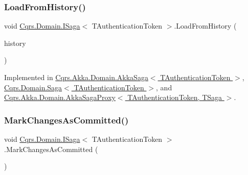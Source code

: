\mbox{\label{interfaceCqrs_1_1Domain_1_1ISaga_a2714804684bc65cf4dec79b4697b9b21_a2714804684bc65cf4dec79b4697b9b21}} 
\subsubsection{\texorpdfstring{Load\+From\+History()}{LoadFromHistory()}}
{\footnotesize\ttfamily void \hyperlink{interfaceCqrs_1_1Domain_1_1ISaga}{Cqrs.\+Domain.\+I\+Saga}$<$ T\+Authentication\+Token $>$.Load\+From\+History (\begin{DoxyParamCaption}\item[{I\+Enumerable$<$ \hyperlink{interfaceCqrs_1_1Events_1_1ISagaEvent}{I\+Saga\+Event}$<$ T\+Authentication\+Token $>$$>$}]{history }\end{DoxyParamCaption})}



Implemented in \hyperlink{classCqrs_1_1Akka_1_1Domain_1_1AkkaSaga_a40b859bc15c2f7c87a21b07f9bc9548c_a40b859bc15c2f7c87a21b07f9bc9548c}{Cqrs.\+Akka.\+Domain.\+Akka\+Saga$<$ T\+Authentication\+Token $>$}, \hyperlink{classCqrs_1_1Domain_1_1Saga_a6029fc09445e2093f7fb40e304a04ff8_a6029fc09445e2093f7fb40e304a04ff8}{Cqrs.\+Domain.\+Saga$<$ T\+Authentication\+Token $>$}, and \hyperlink{classCqrs_1_1Akka_1_1Domain_1_1AkkaSagaProxy_a21b69799b046c1fcdf5b2443699dee0c_a21b69799b046c1fcdf5b2443699dee0c}{Cqrs.\+Akka.\+Domain.\+Akka\+Saga\+Proxy$<$ T\+Authentication\+Token, T\+Saga $>$}.

\mbox{\label{interfaceCqrs_1_1Domain_1_1ISaga_a85c75f80bc5be4bad7f1d9f1231bfba7_a85c75f80bc5be4bad7f1d9f1231bfba7}} 
\subsubsection{\texorpdfstring{Mark\+Changes\+As\+Committed()}{MarkChangesAsCommitted()}}
{\footnotesize\ttfamily void \hyperlink{interfaceCqrs_1_1Domain_1_1ISaga}{Cqrs.\+Domain.\+I\+Saga}$<$ T\+Authentication\+Token $>$.Mark\+Changes\+As\+Committed (\begin{DoxyParamCaption}{ }\end{DoxyParamCaption})}



